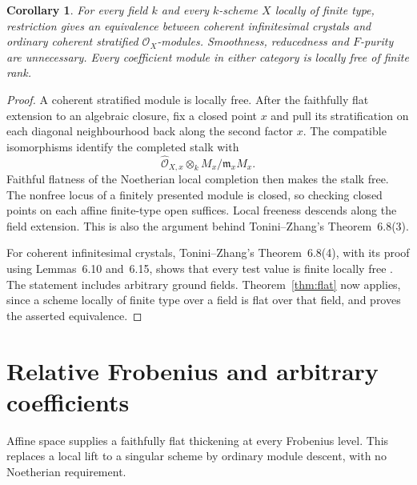 \documentclass[11pt]{article}
\newcommand{\OO}{\mathcal O}\newcommand{\Fp}{\mathbf F_p}
\newtheorem{corollary}[theorem]{Corollary}
\theoremstyle{definition}\newtheorem{definition}[theorem]{Definition}
\theoremstyle{remark}\newtheorem{remark}[theorem]{Remark}
\begin{document}
\begin{corollary}\label{cor:field}
For every field $k$ and every $k$-scheme $X$ locally of finite type, restriction gives an equivalence between coherent infinitesimal crystals and ordinary coherent stratified $\OO_X$-modules.  Smoothness, reducedness and $F$-purity are unnecessary.  Every coefficient module in either category is locally free of finite rank.
\end{corollary}
\begin{proof}
A coherent stratified module is locally free.  After the faithfully flat extension to an algebraic closure, fix a closed point $x$ and pull its stratification on each diagonal neighbourhood back along the second factor $x$.  The compatible isomorphisms identify the completed stalk with
\[
        \widehat{\OO}_{X,x}\otimes_k M_x/\mathfrak m_xM_x.
\]
Faithful flatness of the Noetherian local completion then makes the stalk free.  The nonfree locus of a finitely presented module is closed, so checking closed points on each affine finite-type open suffices.  Local freeness descends along the field extension.  This is also the argument behind Tonini--Zhang's Theorem~6.8(3).

For coherent infinitesimal crystals, Tonini--Zhang's Theorem~6.8(4), with its proof using Lemmas~6.10 and~6.15, shows that every test value is finite locally free \citep{ToniniZhang}.  The statement includes arbitrary ground fields.  Theorem~\ref{thm:flat} now applies, since a scheme locally of finite type over a field is flat over that field, and proves the asserted equivalence.
\end{proof}

\section{Relative Frobenius and arbitrary coefficients}

Affine space supplies a faithfully flat thickening at every Frobenius level. This replaces a local lift to a singular scheme by ordinary module descent, with no Noetherian requirement.
\end{document}
